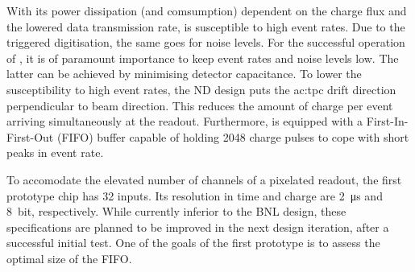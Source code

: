 With its power dissipation (and comsumption) dependent on the charge flux and the lowered data transmission rate, \larpix{} is susceptible to high event rates.
Due to the triggered digitisation, the same goes for noise levels.
For the successful operation of \larpix{}, it is of paramount importance to keep event rates and noise levels low.
The latter can be achieved by minimising detector capacitance.
To lower the susceptibility to high event rates, the \dune{} ND design puts the \gls{ac:tpc} drift direction perpendicular to beam direction.
This reduces the amount of charge per event arriving simultaneously at the readout.
Furthermore, \larpix{} is equipped with a First-In-First-Out (FIFO) buffer capable of holding \num{2048} charge pulses to cope with short peaks in event rate.

To accomodate the elevated number of channels of a pixelated readout, the first \larpix{} prototype chip has \num{32} inputs.
Its resolution in time and charge are \SI{2}{\micro\second} and \SI{8}{bit}, respectively.
While currently inferior to the BNL design, these specifications are planned to be improved in the next design iteration, after a successful initial test.
One of the goals of the first prototype is to assess the optimal size of the FIFO.~\cite{danLarpix}